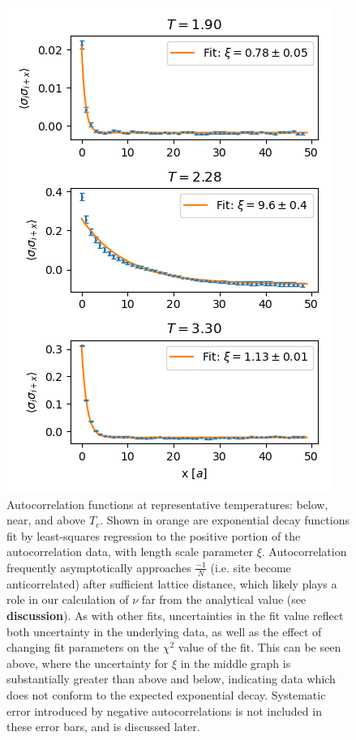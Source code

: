 \documentclass[letter,scriptaddress,twocolumn, prl,nofootinbib]{revtex4}
\begin{document}
\begin{figure}[h]
	\begin{center}
		\includegraphics[width=.5\textwidth]{figs/fig4_autocors.png}
		\caption{Autocorrelation functions at representative temperatures: below, near, and above $T_c$. Shown in orange are exponential decay functions fit by least-squares regression to the positive portion of the autocorrelation data, with length scale parameter $\xi$. Autocorrelation frequently asymptotically approaches $\frac{-1}{N}$ (i.e. site become anticorrelated) after sufficient lattice distance, which likely plays a role in our calculation of $\nu$ far from the analytical value (see \textbf{discussion}). As with other fits, uncertainties in the fit value reflect both uncertainty in the underlying data, as well as the effect of changing fit parameters on the $\chi^2$ value of the fit. This can be seen above, where the uncertainty for $\xi$ in the middle graph is substantially greater than above and below, indicating data which does not conform to the expected exponential decay. Systematic error introduced by negative autocorrelations is not included in these error bars, and is discussed later.}
		\label{fig:fig4a}
	\end{center}
\end{figure}
\end{document}
